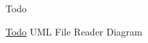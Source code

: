 \begin{DoxyRefDesc}{Todo}
\item[\hyperlink{todo__todo000001}{Todo}]U\-M\-L File Reader Diagram\end{DoxyRefDesc}
